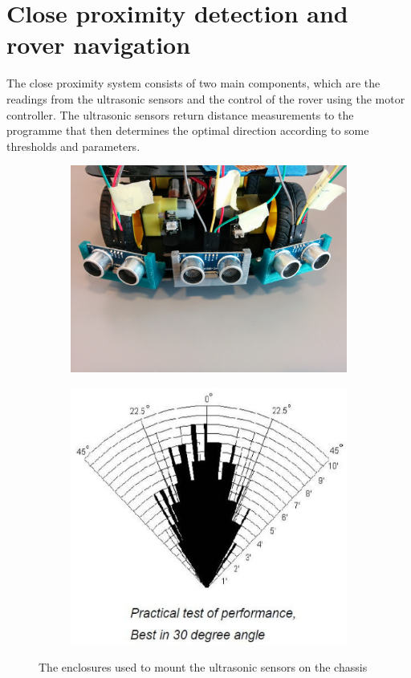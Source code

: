 \clearpage
\section{Close proximity detection and\\ rover navigation}

The close proximity system consists of two main components, which are the readings from the ultrasonic sensors and the control of the rover using the motor controller. The ultrasonic sensors return distance measurements to the programme that then determines the optimal direction according to some thresholds and parameters.

\begin{figure}[H]
	\centering
	\begin{subfigure}[H]{0.4\textwidth}
		\includegraphics[width=\textwidth]{images/mounted_ultrasonic_sensors.jpg}
	\end{subfigure}%
	\quad
	\begin{subfigure}[H]{0.4\textwidth}
		\includegraphics[width=\textwidth]{images/hcsr04angle.png}
	\end{subfigure}
	\caption{The enclosures used to mount the ultrasonic sensors on the chassis}
\end{figure}
